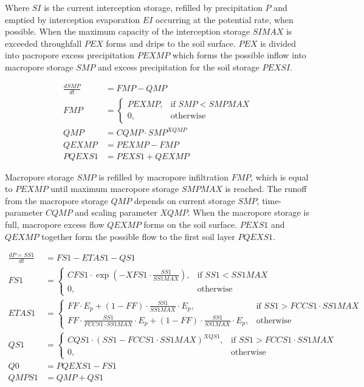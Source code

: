 Where $SI$ is the current interception storage, refilled by precipitation $P$ and emptied by interception evaporation $EI$ occurring at the potential rate, when possible.
When the maximum capacity of the interception storage $SIMAX$ is exceeded throughfall $PEX$ forms and drips to the soil surface.
$PEX$ is divided into pacropore excess precipitation $PEXMP$ which forms the possible inflow into macropore storage $SMP$ and excess precipitation for the soil storage $PEXSI$.

\begin{align}
	\frac{dSMP}{dt} &= FMP-QMP \\
	FMP &= 
	\begin{cases}
		PEXMP, & \text{if } SMP < SMPMAX\\
		0, & \text{otherwise}
	\end{cases}\\[4pt]
	QMP &= CQMP\cdot SMP^{XQMP}\\[4pt]
	QEXMP &= PEXMP - FMP\\[4pt]
	PQEXS1 &= PEXS1 + QEXMP
\end{align}

Macropore storage $SMP$ is refilled by macropore infiltration $FMP$, which is equal to $PEXMP$ until maximum macropore storage $SMPMAX$ is reached.
The runoff from the macropore storage $QMP$ depends on current storage $SMP$, time-parameter $CQMP$ and scaling parameter $XQMP$.
When the macropore storage is full, macropore excess flow $QEXMP$ forms on the soil surface.
$PEXS1$ and $QEXMP$ together form the possible flow to the first soil layer $PQEXS1$.

\begin{align}
	\frac{dP=SS1}{dt} &= FS1 - ETAS1 - QS1 \\
	FS1 &=
	\begin{cases}
		CFS1 \cdot \exp \left(-XFS1\cdot\frac{SS1}{SS1MAX}\right), & \text{if } SS1 < SS1MAX\\
		0, & \text{otherwise}
	\end{cases}\\[4pt]
	ETAS1 &=
     	\begin{cases}
		FF\cdot E_p + (1-FF)\cdot\frac{SS1}{SS1MAX}\cdot E_p, & \text{if } SS1 > FCCS1\cdot SS1MAX\\
		FF\cdot\frac{SS1}{FCCS1\cdot SS1MAX}\cdot E_p + (1-FF)\cdot\frac{SS1}{SS1MAX}\cdot E_p, & \text{otherwise}
	\end{cases}\\[4pt]
	QS1 &=
	\begin{cases}
		CQS1 \cdot (SS1 - FCCS1\cdot SS1MAX)^{XQS1}, & \text{if } SS1 > FCCS1\cdot SS1MAX\\
		0, & \text{otherwise}
	\end{cases}\\[4pt] 
	Q0&=PQEXS1-FS1\\[4pt] 
	QMPS1 &= QMP + QS1
\end{align}

